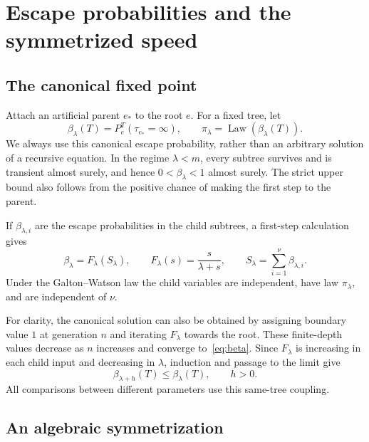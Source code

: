 \documentclass[11pt,a4paper]{article}
\numberwithin{equation}{section}
\theoremstyle{plain}
\theoremstyle{definition}
\theoremstyle{remark}
\newcommand{\Law}{\operatorname{Law}}
\begin{document}
\section{Escape probabilities and the symmetrized speed}\label{sec:setup}

\subsection{The canonical fixed point}

Attach an artificial parent $e_*$ to the root $e$.  For a fixed tree, let
\begin{equation}\label{eq:beta}
 \beta_\lambda(T)=P_e^T(\tau_{e_*}=\infty),
 \qquad \pi_\lambda=\Law(\beta_\lambda(T)).
\end{equation}
We always use this canonical escape probability, rather than an arbitrary
solution of a recursive equation.  In the regime $\lambda<m$, every
subtree survives and is transient almost surely, and hence
$0<\beta_\lambda<1$ almost surely.  The strict upper bound also follows
from the positive chance of making the first step to the parent.

If $\beta_{\lambda,i}$ are the escape probabilities in the child subtrees,
a first-step calculation gives
\begin{equation}\label{eq:rde}
 \beta_\lambda
 =F_\lambda(S_\lambda),\qquad
 F_\lambda(s)=\frac{s}{\lambda+s},\qquad
 S_\lambda=\sum_{i=1}^{\nu}\beta_{\lambda,i}.
\end{equation}
Under the Galton--Watson law the child variables are independent, have law
$\pi_\lambda$, and are independent of $\nu$.

For clarity, the canonical solution can also be obtained by assigning
boundary value $1$ at generation $n$ and iterating $F_\lambda$ towards the
root.  These finite-depth values decrease as $n$ increases and converge
to~\eqref{eq:beta}.  Since $F_\lambda$ is increasing in each child input
and decreasing in $\lambda$, induction and passage to the limit give
\begin{equation}\label{eq:pathwise-monotone}
 \beta_{\lambda+h}(T)\le\beta_\lambda(T),\qquad h>0.
\end{equation}
All comparisons between different parameters use this same-tree coupling.

\subsection{An algebraic symmetrization}
\end{document}
